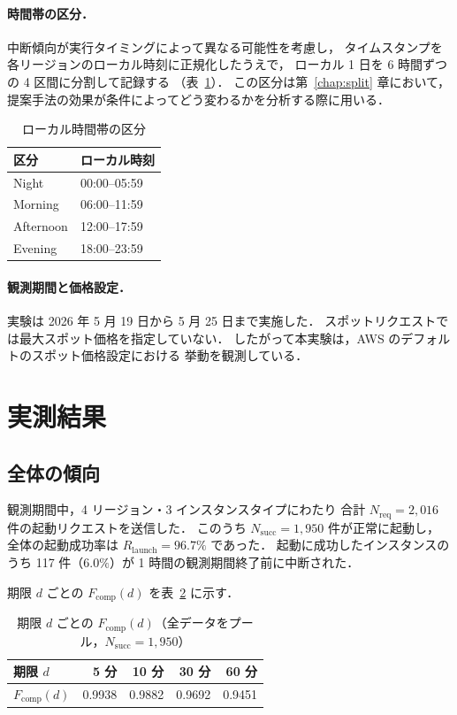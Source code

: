 \documentclass[11pt,a4paper]{ltjsreport}
\newcommand{\Fcomp}{F_{\mathrm{comp}}}
\newcommand{\Rlaunch}{R_{\mathrm{launch}}}
\newcommand{\Nreq}{N_{\mathrm{req}}}
\newcommand{\Nsucc}{N_{\mathrm{succ}}}
\begin{document}
\paragraph{時間帯の区分．}
中断傾向が実行タイミングによって異なる可能性を考慮し，
タイムスタンプを各リージョンのローカル時刻に正規化したうえで，
ローカル 1 日を 6 時間ずつの 4 区間に分割して記録する
（表~\ref{tab:periods}）．
この区分は第~\ref{chap:split} 章において，
提案手法の効果が条件によってどう変わるかを分析する際に用いる．

\begin{table}[htbp]
\centering
\caption{ローカル時間帯の区分}
\label{tab:periods}
\small
\begin{tabular}{@{}ll@{}}
\toprule
区分 & ローカル時刻 \\
\midrule
Night     & 00:00--05:59 \\
Morning   & 06:00--11:59 \\
Afternoon & 12:00--17:59 \\
Evening   & 18:00--23:59 \\
\bottomrule
\end{tabular}
\end{table}

\paragraph{観測期間と価格設定．}
実験は 2026 年 5 月 19 日から 5 月 25 日まで実施した．
スポットリクエストでは最大スポット価格を指定していない．
したがって本実験は，AWS のデフォルトのスポット価格設定における
挙動を観測している．

\section{実測結果}

\subsection{全体の傾向}

観測期間中，4 リージョン・3 インスタンスタイプにわたり
合計 $\Nreq = 2{,}016$ 件の起動リクエストを送信した．
このうち $\Nsucc = 1{,}950$ 件が正常に起動し，
全体の起動成功率は $\Rlaunch = 96.7\%$ であった．
起動に成功したインスタンスのうち 117 件（$6.0\%$）が
1 時間の観測期間終了前に中断された．

期限 $d$ ごとの $\Fcomp(d)$ を表~\ref{tab:fcomp_overall} に示す．

\begin{table}[htbp]
\centering
\caption{期限 $d$ ごとの $\Fcomp(d)$（全データをプール，$\Nsucc = 1{,}950$）}
\label{tab:fcomp_overall}
\small
\begin{tabular}{@{}lrrrr@{}}
\toprule
期限 $d$ & 5 分 & 10 分 & 30 分 & 60 分 \\
\midrule
$\Fcomp(d)$ & 0.9938 & 0.9882 & 0.9692 & 0.9451 \\
\bottomrule
\end{tabular}
\end{table}
\end{document}

